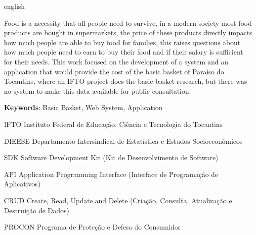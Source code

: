 \documentclass{ifto-tex}
\begin{document}
\begin{resumo}[Abstract]
	\begin{otherlanguage*}{english}
	
	Food is a necessity that all people need to survive, in a modern society most food products are bought in supermarkets, the price of these products directly impacts how much people are able to buy food for families, this raises questions about how much people need to earn to buy their food and if their salary is sufficient for their needs. This work focused on the development of a system and an application that would provide the cost of the basic basket of Paraíso do Tocantins, where an IFTO project does the basic basket research, but there was no system to make this data available for public consultation.
		
		\noindent 
		\textbf{Keywords}: Basic Basket, Web System, Application
	\end{otherlanguage*}
\end{resumo}


\listoffigures*
\cleardoublepage


\listoftables*
\cleardoublepage

\begin{siglas}
	\item[IFTO]{Instituto Federal de Educação, Ciência e Tecnologia do Tocantins}
	\item[DIEESE]{Departamento Intersindical de Estatística e Estudos Socioeconômicos}
	\item[SDK]{Software Development Kit (Kit de Desenvolvimento de Software)}
	\item [API]{Application Programming Interface (Interface de Programação de Aplicativos)}
	\item[CRUD]{Create, Read, Update and Delete (Criação, Consulta, Atualização e Destruição de Dados)}
	\item[PROCON]{Programa de Proteção e Defesa do Consumidor}
\end{siglas}
\end{document}

